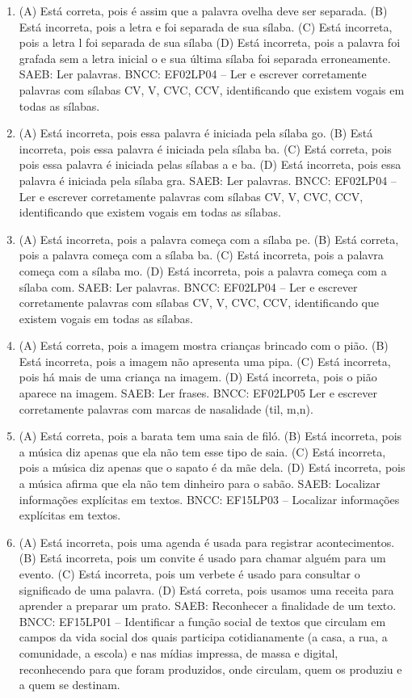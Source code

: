 \begin{enumerate}
\item
(A) Está correta, pois é assim que a palavra ovelha deve ser separada.
(B) Está incorreta, pois a letra e foi separada de sua sílaba.
(C) Está incorreta, pois a letra l foi separada de sua sílaba
(D) Está incorreta, pois a palavra foi grafada sem a letra inicial o e sua última sílaba foi separada erroneamente.
SAEB: Ler palavras.
BNCC: EF02LP04 -- Ler e escrever corretamente palavras com sílabas
CV, V, CVC, CCV, identificando que existem vogais em todas as sílabas.

\item
(A) Está incorreta, pois essa palavra é iniciada pela sílaba go.
(B) Está incorreta, pois essa palavra é iniciada pela sílaba ba.
(C) Está correta, pois pois essa palavra é iniciada pelas sílabas a e ba.
(D) Está incorreta, pois essa palavra é iniciada pela sílaba gra.
SAEB: Ler palavras.
BNCC: EF02LP04 -- Ler e escrever corretamente palavras com
sílabas CV, V, CVC, CCV, identificando que existem vogais em todas as
sílabas.

\item
(A) Está incorreta, pois a palavra começa com a sílaba pe.
(B) Está correta, pois a palavra começa com a sílaba ba.
(C) Está incorreta, pois a palavra começa com a sílaba mo.
(D) Está incorreta, pois a palavra começa com a sílaba com.
SAEB: Ler palavras.
BNCC: EF02LP04 -- Ler e escrever corretamente palavras com sílabas CV, V, CVC, CCV, identificando que existem vogais em todas as sílabas.

\item
(A) Está correta, pois a imagem mostra crianças brincado com o pião.
(B) Está incorreta, pois a imagem não apresenta uma pipa.
(C) Está incorreta, pois há mais de uma criança na imagem.
(D) Está incorreta, pois o pião aparece na imagem.
SAEB: Ler frases.
BNCC: EF02LP05 Ler e escrever corretamente palavras com marcas
de nasalidade (til, m,n).

\item
(A) Está correta, pois a barata tem uma saia de filó.
(B) Está incorreta, pois a música diz apenas que ela não tem esse tipo de saia.
(C) Está incorreta, pois a música diz apenas que o sapato é da mãe dela.
(D) Está incorreta, pois a música afirma que ela não tem dinheiro para o sabão.
SAEB: Localizar informações explícitas em textos.
BNCC: EF15LP03 -- Localizar informações explícitas em textos.

\item
(A) Está incorreta, pois uma agenda é usada para registrar acontecimentos.
(B) Está incorreta, pois um convite é usado para chamar alguém para um evento.
(C) Está incorreta, pois um verbete é usado para consultar o significado de uma palavra.
(D) Está correta, pois usamos uma receita para aprender a preparar um prato.
SAEB: Reconhecer a finalidade de um texto.
BNCC: EF15LP01 -- Identificar a função social de textos que circulam em
campos da vida social dos quais participa cotidianamente (a casa, a rua,
a comunidade, a escola) e nas mídias impressa, de massa e digital,
reconhecendo para que foram produzidos, onde circulam, quem os produziu
e a quem se destinam.


\end{enumerate}
